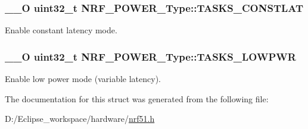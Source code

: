 \subsubsection[{T\+A\+S\+K\+S\+\_\+\+C\+O\+N\+S\+T\+L\+A\+T}]{\setlength{\rightskip}{0pt plus 5cm}\+\_\+\+\_\+\+O uint32\+\_\+t N\+R\+F\+\_\+\+P\+O\+W\+E\+R\+\_\+\+Type\+::\+T\+A\+S\+K\+S\+\_\+\+C\+O\+N\+S\+T\+L\+A\+T}\label{struct_n_r_f___p_o_w_e_r___type_a4fea8c0736739a7a7501553af857dbb5}
Enable constant latency mode. \hypertarget{struct_n_r_f___p_o_w_e_r___type_a73c2db8f3896ab3a0581388e418577a2}{}
\subsubsection[{T\+A\+S\+K\+S\+\_\+\+L\+O\+W\+P\+W\+R}]{\setlength{\rightskip}{0pt plus 5cm}\+\_\+\+\_\+\+O uint32\+\_\+t N\+R\+F\+\_\+\+P\+O\+W\+E\+R\+\_\+\+Type\+::\+T\+A\+S\+K\+S\+\_\+\+L\+O\+W\+P\+W\+R}\label{struct_n_r_f___p_o_w_e_r___type_a73c2db8f3896ab3a0581388e418577a2}
Enable low power mode (variable latency). 

The documentation for this struct was generated from the following file\+:\begin{DoxyCompactItemize}
\item 
D\+:/\+Eclipse\+\_\+workspace/hardware/\hyperlink{nrf51_8h}{nrf51.\+h}\end{DoxyCompactItemize}
